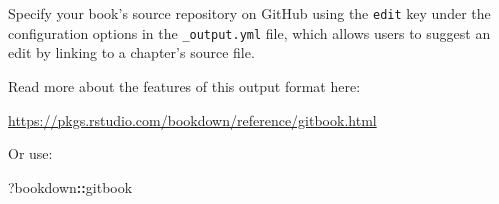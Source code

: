 \documentclass[
  20pt,
]{book}
\newenvironment{Shaded}{\begin{snugshade}}{\end{snugshade}}
\newcommand{\NormalTok}[1]{#1}
\newcommand{\SpecialCharTok}[1]{\textcolor[rgb]{0.81,0.36,0.00}{\textbf{#1}}}
\theoremstyle{definition}
\theoremstyle{definition}
\theoremstyle{definition}
\theoremstyle{definition}
\theoremstyle{remark}
\begin{document}
Specify your book's source repository on GitHub using the \texttt{edit} key under the configuration options in the \texttt{\_output.yml} file, which allows users to suggest an edit by linking to a chapter's source file.

Read more about the features of this output format here:

\url{https://pkgs.rstudio.com/bookdown/reference/gitbook.html}

Or use:

\begin{Shaded}
\begin{Highlighting}[]
\NormalTok{?bookdown}\SpecialCharTok{::}\NormalTok{gitbook}
\end{Highlighting}
\end{Shaded}


  
\end{document}
